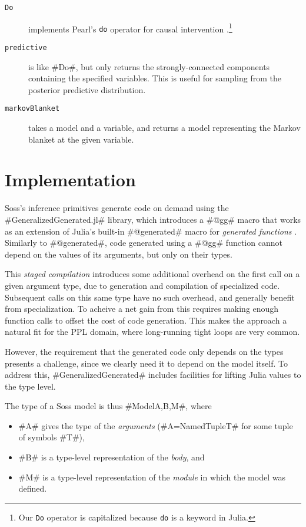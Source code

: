\documentclass[anonymous=false, %
               format=acmsmall, %
               review=false, %
               screen=true, %
               nonacm=true]{acmart}
\begin{document}
\begin{description}
    \item[\texttt{Do}] implements Pearl's {\footnotesize\texttt{do}} operator for causal intervention \cite{Pearl1995}.\footnote{Our {\footnotesize\texttt{Do}} operator is capitalized because {\footnotesize\texttt{do}} is a keyword in Julia.}
    \item[\texttt{predictive}] is like \jl#Do#, but only returns the strongly-connected components containing the specified variables. This is useful for sampling from the posterior predictive distribution.
    \item[\texttt{markovBlanket}]  takes a model and a variable, and returns a model representing the Markov blanket at the given variable.
\end{description}

\section{Implementation}

Soss's inference primitives generate code on demand using the \jl#GeneralizedGenerated.jl# library, which introduces a \jl#@gg# macro that works as an extension of Julia's built-in \jl#@generated# macro for \emph{generated functions} \cite{bezanson2012julia}. Similarly to \jl#@generated#, code generated using a \jl#@gg# function cannot depend on the values of its arguments, but only on their types. 

This \emph{staged compilation} introduces some additional overhead on the first call on a given argument type, due to generation and compilation of specialized code. Subsequent calls on this same type have no such overhead, and generally benefit from specialization. To acheive a net gain from this requires making enough function calls to offset the cost of code generation. This makes the approach a natural fit for the PPL domain, where long-running tight loops are very common. 

However, the requirement that the generated code only depends on the types presents a challenge, since we clearly need it to depend on the model itself. To address this, \jl#GeneralizedGenerated# includes facilities for lifting Julia values to the type level. 

The type of a Soss model is thus \jl#Model{A,B,M}#, where 
\begin{itemize}
    \item \jl#A# gives the type of the \emph{arguments} (\jl#A=NamedTuple{T}# for some tuple of symbols \jl#T#),
    \item \jl#B# is a type-level representation of the \emph{body}, and
    \item \jl#M# is a type-level representation of the \emph{module} in which the model was defined.
\end{itemize}
\end{document}
